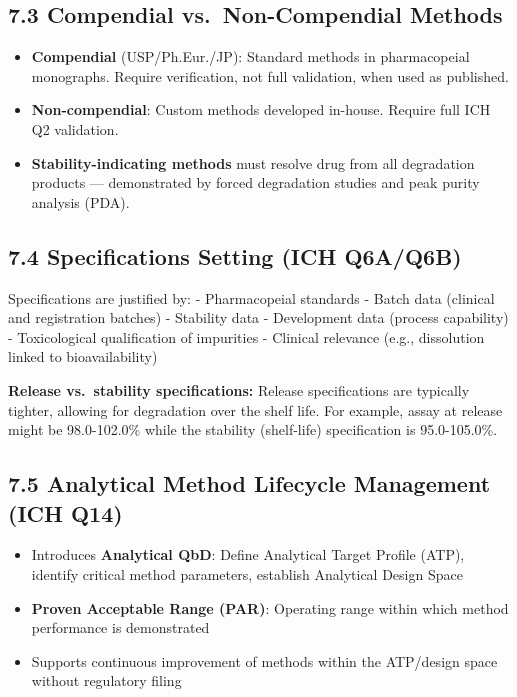 \documentclass[
  11pt,
  a4paper,
]{report}
\providecommand{\tightlist}{%
  \setlength{\itemsep}{0pt}\setlength{\parskip}{0pt}}
\begin{document}
\hypertarget{compendial-vs.-non-compendial-methods}{%
\subsection{7.3 Compendial vs.~Non-Compendial
Methods}\label{compendial-vs.-non-compendial-methods}}

\begin{itemize}
\tightlist
\item
  \textbf{Compendial} (USP/Ph.Eur./JP): Standard methods in
  pharmacopeial monographs. Require verification, not full validation,
  when used as published.
\item
  \textbf{Non-compendial}: Custom methods developed in-house. Require
  full ICH Q2 validation.
\item
  \textbf{Stability-indicating methods} must resolve drug from all
  degradation products --- demonstrated by forced degradation studies
  and peak purity analysis (PDA).
\end{itemize}

\hypertarget{specifications-setting-ich-q6aq6b}{%
\subsection{7.4 Specifications Setting (ICH
Q6A/Q6B)}\label{specifications-setting-ich-q6aq6b}}

Specifications are justified by: - Pharmacopeial standards - Batch data
(clinical and registration batches) - Stability data - Development data
(process capability) - Toxicological qualification of impurities -
Clinical relevance (e.g., dissolution linked to bioavailability)

\textbf{Release vs.~stability specifications:} Release specifications
are typically tighter, allowing for degradation over the shelf life. For
example, assay at release might be 98.0-102.0\% while the stability
(shelf-life) specification is 95.0-105.0\%.

\hypertarget{analytical-method-lifecycle-management-ich-q14}{%
\subsection{7.5 Analytical Method Lifecycle Management (ICH
Q14)}\label{analytical-method-lifecycle-management-ich-q14}}

\begin{itemize}
\tightlist
\item
  Introduces \textbf{Analytical QbD}: Define Analytical Target Profile
  (ATP), identify critical method parameters, establish Analytical
  Design Space
\item
  \textbf{Proven Acceptable Range (PAR)}: Operating range within which
  method performance is demonstrated
\item
  Supports continuous improvement of methods within the ATP/design space
  without regulatory filing
\end{itemize}
\end{document}
